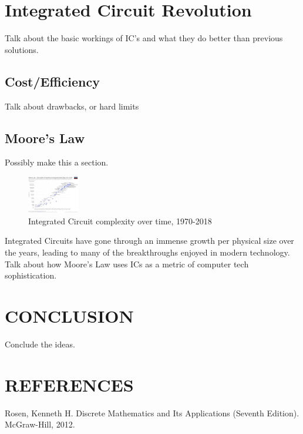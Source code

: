 \documentclass[letterpaper, 10 pt, conference]{IEEEconf}
\begin{document}

\section{Integrated Circuit Revolution}

Talk about the basic workings of IC's and what they do better than previous solutions.

\subsection{Cost/Efficiency}
Talk about drawbacks, or hard limits

\subsection{Moore's Law}
Possibly make this a section.

\begin{figure}[h!]
\centering
\captionsetup{justification=centering}
\includegraphics[width=0.2\textwidth]{1024px-Moore's_Law_Transistor_Count_1971-2018.png}
\caption{Integrated Circuit complexity over time, 1970-2018}
\label{fig:example}
\end{figure} 


Integrated Circuits have gone through an immense growth per physical size over the years, leading to many of the breakthroughs enjoyed in modern technology. Talk about how Moore's Law uses ICs as a metric of computer tech sophistication.


\section{CONCLUSION}

Conclude the ideas.

\section*{REFERENCES}


\begin{enumerate}[label={[\arabic*]}]
\item Rosen, Kenneth  H. Discrete Mathematics and Its Applications (Seventh Edition). McGraw-Hill, 2012. 
\end{enumerate}
\end{document}
